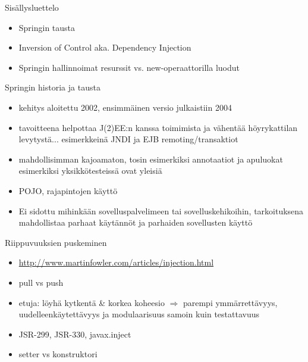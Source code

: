 \documentclass[hyperref={pdfauthor=\AUTHOR},14pt]{beamer}
\author{\AUTHOR}
\title[\TITLE]{\TITLE}
\date{\DATE}
\begin{document}
\begin{frame}[plain]
\titlepage
\end{frame}

\begin{frame}[t, fragile]{Sisällysluettelo}
\begin{itemize}
\item Springin tausta
\item Inversion of Control aka. Dependency Injection
\item Springin hallinnoimat resurssit vs. new-operaattorilla luodut
\end{itemize}
\end{frame}

\begin{frame}{Springin historia ja tausta}
\begin{itemize}
\item kehitys aloitettu 2002, ensimmäinen versio julkaistiin 2004
\item tavoitteena helpottaa J(2)EE:n kanssa toimimista ja vähentää
  höyrykattilan levytystä... esimerkkeinä JNDI ja EJB remoting/transaktiot
\item mahdollisimman kajoamaton, tosin esimerkiksi annotaatiot ja
  apuluokat esimerkiksi yksikkötesteissä ovat yleisiä
\item POJO, rajapintojen käyttö
\item Ei sidottu mihinkään sovelluspalvelimeen tai sovelluskehikoihin,
  tarkoituksena mahdollistaa parhaat käytännöt ja parhaiden
  sovellusten käyttö
\end{itemize}
\end{frame}

\begin{frame}{Riippuvuuksien puskeminen}
\begin{itemize}
\item \url{http://www.martinfowler.com/articles/injection.html}
\item pull vs push
%
\item etuja: löyhä kytkentä \& korkea koheesio $ \Rightarrow $ parempi
  ymmärrettävyys, uudelleenkäytettävyys ja modulaarisuus samoin kuin testattavuus
\item JSR-299, JSR-330, javax.inject
\item setter vs konstruktori
\end{itemize}
\end{frame}
\end{document}
